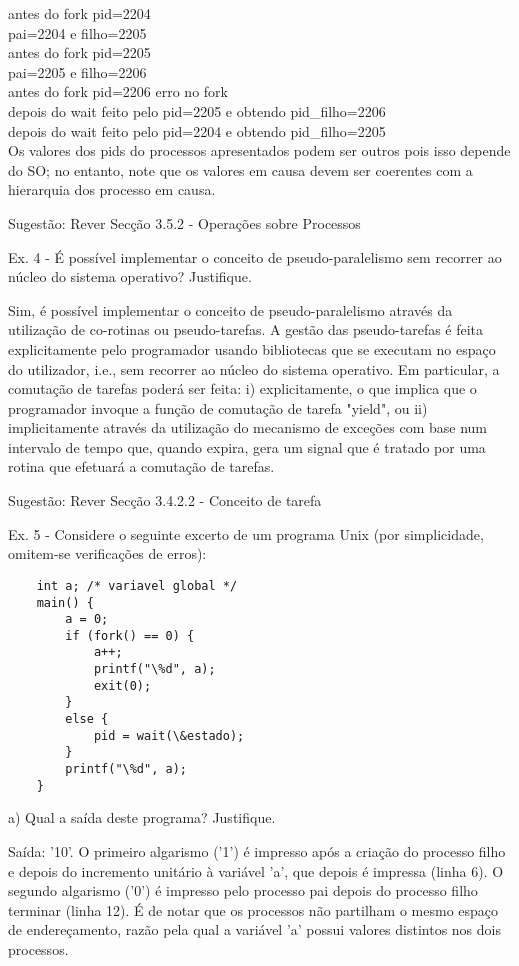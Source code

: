 \documentclass[11pt]{article}
\begin{document}
antes do fork pid=2204 \\
pai=2204 e filho=2205 \\
antes do fork pid=2205 \\
pai=2205 e filho=2206 \\
antes do fork pid=2206 erro no fork \\
depois do wait feito pelo pid=2205 e obtendo pid\_filho=2206 \\
depois do wait feito pelo pid=2204 e obtendo pid\_filho=2205 \\
Os valores dos pids do processos apresentados podem ser outros pois isso depende do SO; no entanto, note que os valores em causa devem ser coerentes com a hierarquia dos processo em causa.

Sugestão: Rever Secção 3.5.2 - Operações sobre Processos


Ex. 4 - É possível implementar o conceito de pseudo-paralelismo sem recorrer ao núcleo do sistema operativo? Justifique.

Sim, é possível implementar o conceito de pseudo-paralelismo através da utilização de co-rotinas ou pseudo-tarefas. A gestão das pseudo-tarefas é feita explicitamente pelo programador usando bibliotecas que se executam no espaço do utilizador, i.e., sem recorrer ao núcleo do sistema operativo. Em particular, a comutação de tarefas poderá ser feita: i) explicitamente, o que implica que o programador invoque a função de comutação de tarefa "yield", ou ii) implicitamente através da utilização do mecanismo de exceções com base num intervalo de tempo que, quando expira, gera um signal que é tratado por uma rotina que efetuará a comutação de tarefas.

Sugestão: Rever Secção 3.4.2.2 - Conceito de tarefa


Ex. 5 - Considere o seguinte excerto de um programa Unix (por simplicidade, omitem-se verificações de erros):

\begin{lstlisting}
    int a; /* variavel global */
    main() {
        a = 0;
        if (fork() == 0) {
            a++;
            printf("\%d", a);
            exit(0);
        }
        else {
            pid = wait(\&estado);
        }
        printf("\%d", a);
    }
\end{lstlisting}


a) Qual a saída deste programa? Justifique.

Saída: '10'. O primeiro algarismo ('1') é impresso após a criação do processo filho e depois do incremento unitário à variável 'a', que depois é impressa (linha 6). O segundo algarismo ('0') é impresso pelo processo pai depois do processo filho terminar (linha 12). É de notar que os processos não partilham o mesmo espaço de endereçamento, razão pela qual a variável 'a' possui valores distintos nos dois processos.
\end{document}
